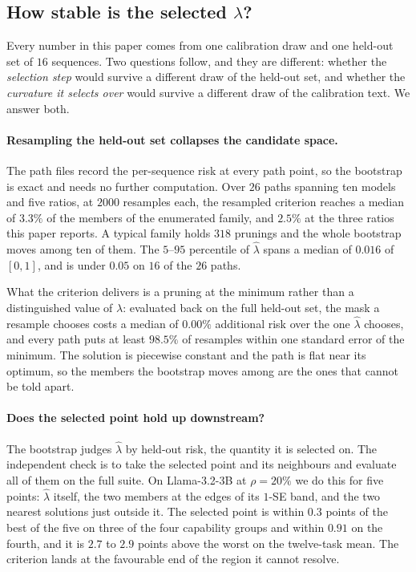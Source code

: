 \subsection{How stable is the selected \texorpdfstring{$\lambda$}{lambda}?}
\label{app:lambda-robust}

Every number in this paper comes from one calibration draw and one held-out set of $16$ sequences.
Two questions follow, and they are different: whether the \emph{selection step} would survive a
different draw of the held-out set, and whether the \emph{curvature it selects over} would survive a
different draw of the calibration text. We answer both.

\paragraph{Resampling the held-out set collapses the candidate space.} The path files record the
per-sequence risk at every path point, so the bootstrap is exact and needs no further computation.
Over $26$ paths spanning ten models and five ratios, at $2000$ resamples each, the resampled
criterion reaches a median of $3.3\%$ of the members of the enumerated family, and $2.5\%$ at the
three ratios this paper reports. A typical family holds $318$ prunings and the whole bootstrap moves
among ten of them. The $5$--$95$ percentile of $\hat\lambda$ spans a median of $0.016$ of $[0,1]$,
and is under $0.05$ on $16$ of the $26$ paths.

What the criterion delivers is a pruning at the minimum rather than a distinguished value of
$\lambda$: evaluated back on the full held-out set, the mask a resample chooses costs a median of
$0.00\%$ additional risk over the one $\hat\lambda$ chooses, and every path puts at least $98.5\%$ of
resamples within one standard error of the minimum. The solution is piecewise constant and the path
is flat near its optimum, so the members the bootstrap moves among are the ones that cannot be told
apart.

\paragraph{Does the selected point hold up downstream?} The bootstrap judges $\hat\lambda$ by
held-out risk, the quantity it is selected on. The independent check is to take the selected point
and its neighbours and evaluate all of them on the full suite. On Llama-3.2-3B at $\rho{=}20\%$ we do
this for five points: $\hat\lambda$ itself, the two members at the edges of its $1$-SE band, and the
two nearest solutions just outside it. The selected point is within $0.3$ points of the best of the
five on three of the four capability groups and within $0.91$ on the fourth, and it is $2.7$ to $2.9$
points above the worst on the twelve-task mean. The criterion lands at the favourable end of the
region it cannot resolve.

